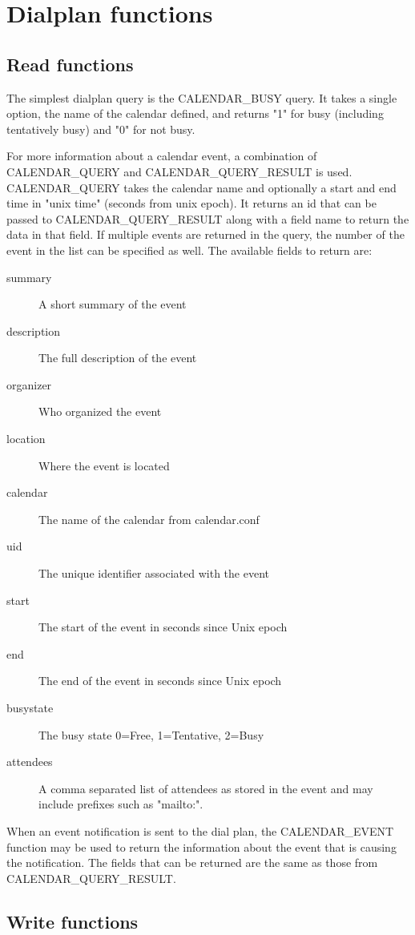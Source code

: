 \section{Dialplan functions}
\subsection{Read functions}

The simplest dialplan query is the CALENDAR\_BUSY query. It takes a single
option, the name of the calendar defined, and returns "1" for busy (including
tentatively busy) and "0" for not busy.

For more information about a calendar event, a combination of CALENDAR\_QUERY
and CALENDAR\_QUERY\_RESULT is used.  CALENDAR\_QUERY takes the calendar name
and optionally a start and end time in "unix time" (seconds from unix epoch). It
returns an id that can be passed to CALENDAR\_QUERY\_RESULT along with a field
name to return the data in that field. If multiple events are returned in the
query, the number of the event in the list can be specified as well. The available
fields to return are:
\begin{description}
\item[summary] A short summary of the event
\item[description] The full description of the event
\item[organizer] Who organized the event
\item[location] Where the event is located
\item[calendar] The name of the calendar from calendar.conf
\item[uid] The unique identifier associated with the event
\item[start] The start of the event in seconds since Unix epoch
\item[end] The end of the event in seconds since Unix epoch
\item[busystate] The busy state 0=Free, 1=Tentative, 2=Busy
\item[attendees] A comma separated list of attendees as stored in the event and
may include prefixes such as "mailto:".
\end{description}

When an event notification is sent to the dial plan, the CALENDAR\_EVENT
function may be used to return the information about the event that is causing
the notification. The fields that can be returned are the same as those from
CALENDAR\_QUERY\_RESULT.
\subsection{Write functions}

